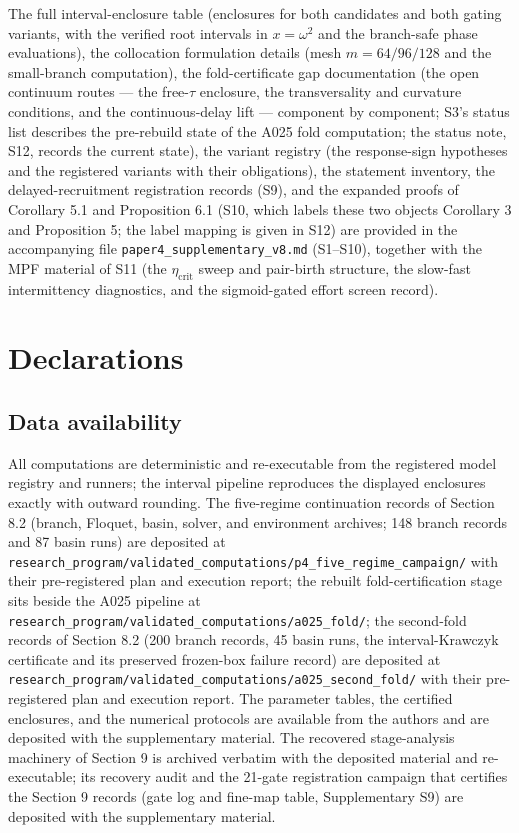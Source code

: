 \documentclass[11pt]{article}
\begin{document}
The full interval-enclosure table (enclosures for both candidates and
both gating variants, with the verified root intervals in
\(x = \omega^2\) and the branch-safe phase evaluations), the collocation
formulation details (mesh \(m = 64/96/128\) and the small-branch
computation), the fold-certificate gap documentation (the open continuum
routes --- the free-\(\tau\) enclosure, the transversality and curvature
conditions, and the continuous-delay lift --- component by component;
S3's status list describes the pre-rebuild state of the A025 fold
computation; the status note, S12, records the current state), the
variant registry (the response-sign hypotheses and the registered
variants with their obligations), the statement inventory, the
delayed-recruitment registration records (S9), and the expanded proofs
of Corollary 5.1 and Proposition 6.1 (S10, which labels these two
objects Corollary 3 and Proposition 5; the label mapping is given in
S12) are provided in the accompanying file
\texttt{paper4\_supplementary\_v8.md} (S1--S10), together with the MPF
material of S11 (the \(\eta_{\mathrm{crit}}\) sweep and pair-birth
structure, the slow-fast intermittency diagnostics, and the
sigmoid-gated effort screen record).

\section*{Declarations}

\subsection*{Data availability}

All computations are deterministic and re-executable from the registered
model registry and runners; the interval pipeline reproduces the
displayed enclosures exactly with outward rounding. The five-regime
continuation records of Section 8.2 (branch, Floquet, basin, solver, and
environment archives; 148 branch records and 87 basin runs) are
deposited at
\texttt{research\_program/validated\_computations/p4\_five\_regime\_campaign/}
with their pre-registered plan and execution report; the rebuilt
fold-certification stage sits beside the A025 pipeline at
\texttt{research\_program/validated\_computations/a025\_fold/}; the
second-fold records of Section 8.2 (200 branch records, 45 basin runs,
the interval-Krawczyk certificate and its preserved frozen-box failure
record) are deposited at
\texttt{research\_program/validated\_computations/a025\_second\_fold/}
with their pre-registered plan and execution report. The parameter
tables, the certified enclosures, and the numerical protocols are
available from the authors and are deposited with the supplementary
material. The recovered stage-analysis machinery of Section 9 is
archived verbatim with the deposited material and re-executable; its
recovery audit and the 21-gate registration campaign that certifies the
Section 9 records (gate log and fine-map table, Supplementary S9) are
deposited with the supplementary material.
\end{document}
